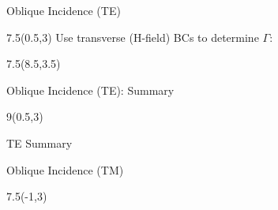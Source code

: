 \begin{lesson40}

\begin{frame}{Oblique Incidence (TE)}
\begin{textblock}{7.5}(0.5,3) 
Use transverse (H-field) BCs to determine $\Gamma$:
\begin{small}
\end{small}
\end{textblock}


\begin{textblock}{7.5}(8.5,3.5)
\begin{small}
\end{small}
\end{textblock}
\end{frame}


\begin{frame}{Oblique Incidence (TE): Summary}
\begin{textblock}{9}(0.5,3) 
\begin{myblock}[0.9]{TE Summary}
\end{myblock}
\end{textblock}
\end{frame}


\begin{frame}{Oblique Incidence (TM)}
\begin{textblock}{7.5}(-1,3) 
\scalebox{0.99}{
	
}
\end{textblock}



\end{frame}
\end{lesson40}

